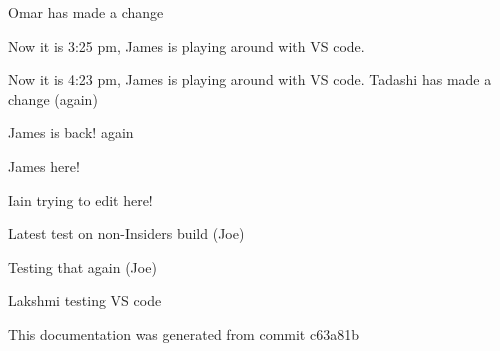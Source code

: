 \label{index_md_repo_README}%
%
Omar has made a change

Now it is 3\+:25 pm, James is playing around with VS code.

Now it is 4\+:23 pm, James is playing around with VS code. Tadashi has made a change (again)

James is back! again

James here!

Iain trying to edit here!

Latest test on non-\/\+Insiders build (Joe)

Testing that again (Joe)

Lakshmi testing VS code

This documentation was generated from commit c63a81b 